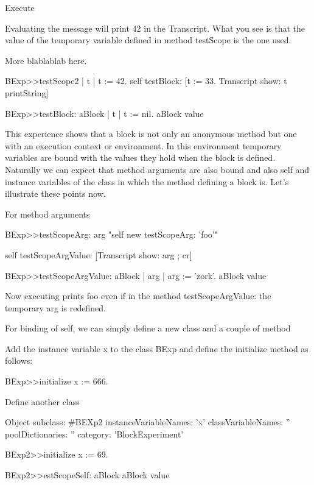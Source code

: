 \documentclass[a4paper,10pt,twoside]{book}
\begin{document}
Execute 

Evaluating the  message will print 42 in the Transcript. What you see is that the value of the temporary variable  defined in method testScope is the one used.

More blablablab here.


\begin{code}{}
BExp>>testScope2 
	| t | 
	t := 42. 
	self testBlock: [t := 33.
					Transcript show: t printString] 	
	
BExp>>testBlock: aBlock
	| t | 
	t := nil. 
	aBlock value 
\end{code}

This experience shows that a block is not only an anonymous method but one with an execution context or environment. In this environment temporary variables are bound with the values they hold when the block 
is defined. Naturally we can expect that method arguments are also bound and also self and instance variables of the class in which the method defining a block is. Let's illustrate these points now. 

For method arguments

\begin{code}{}
BExp>>testScopeArg: arg
	"self new testScopeArg: 'foo'"
	
	self testScopeArgValue: [Transcript show: arg ; cr]

BExp>>testScopeArgValue: aBlock
	| arg | 
	arg := 'zork'.
	aBlock value
\end{code}

Now executing  prints foo even if in the method testScopeArgValue: the temporary arg is redefined. 


For binding of self, we can simply define a new class and a couple of method

Add the instance variable x to the class BExp and define the initialize method
as follows:

\begin{code}{}
BExp>>initialize
	x := 666.
\end{code}	

Define another class 
\begin{code}{}
Object subclass: #BEXp2
	instanceVariableNames: 'x'
	classVariableNames: ''
	poolDictionaries: ''
	category: 'BlockExperiment'
\end{code}


\begin{code}{}
BExp2>>initialize
	x := 69.

BExp2>>estScopeSelf: aBlock
	aBlock value
\end{code}
\end{document}
